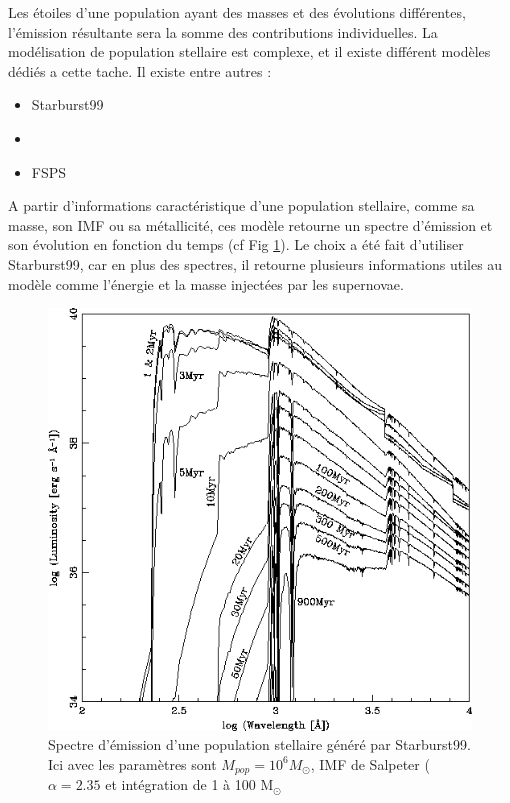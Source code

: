 Les étoiles d'une population ayant des masses et des évolutions différentes, l'émission résultante sera la somme des contributions individuelles.
La modélisation de population stellaire est complexe, et il existe différent modèles dédiés a cette tache.
Il existe entre autres :

\begin{itemize}
\item Starburst99 \citep{leitherer_starburst99:_1999} 
\item \cite{2003MNRAS.344.1000B}
\item FSPS \cite{2009ApJ...699..486C}
\end{itemize}

A partir d'informations caractéristique d'une population stellaire, comme sa masse, son \ac{IMF} ou sa métallicité, ces modèle retourne un spectre d'émission et son évolution en fonction du temps (cf Fig \ref{fig:spectre_starburst}).
Le choix a été fait d'utiliser Starburst99, car en plus des spectres, il retourne plusieurs informations utiles au modèle comme l'énergie et la masse injectées par les supernovae. %

\begin{figure}
        \includegraphics[width=.95\linewidth]{img/03/spectre_starburst.jpg} 
        \caption{Spectre d'émission d'une population stellaire généré par Starburst99.
        Ici avec les paramètres sont $M_{pop}=10^6 M_\odot$, \ac{IMF} de Salpeter ($\alpha=2.35$ et intégration de 1 à 100 M$_\odot$ 
 		\label{fig:spectre_starburst}}
\end{figure}



